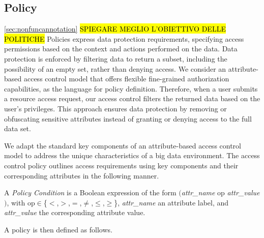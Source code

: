 \subsection{Policy}\ref{sec:nonfuncannotation}
\hl{SPIEGARE MEGLIO L'OBIETTIVO DELLE POLITICHE}
Policies express data protection requirements, specifying access permissions based on the context and actions performed on the data.
Data protection is enforced by filtering data to return a subset, including the possibility of an empty set, rather than denying access.
We consider an attribute-based access control model that offers flexible fine-grained authorization capabilities, as the language for policy definition.
Therefore, when a user submits a resource access request, our access
control filters the returned data based on the user's privileges.
This approach ensures data protection by removing or obfuscating sensitive attributes instead of granting or denying access to the full data set.

We adapt the standard key components of an attribute-based access control model to address the unique characteristics of a big data environment.
The access control policy outlines access requirements using key components and their corresponding attributes in the following manner.

\begin{definition}\label{def:policy_cond}
  A \emph{Policy Condition} is a Boolean expression of the form $($\emph{attr\_name} op \emph{attr\_value}$)$, with op$\in$\{$<$,$>$,$=$,$\neq$,$\leq$,$\geq$\}, \emph{attr\_name} an attribute label, and \emph{attr\_value} the corresponding attribute value.
\end{definition}

A policy is then defined as follows.

